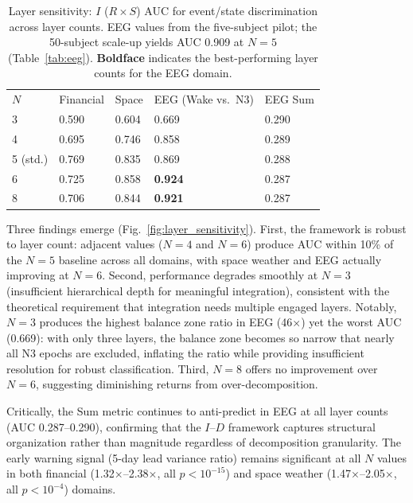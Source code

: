 \documentclass[aip,cha,reprint,amsmath,amssymb,final,floatfix]{revtex4-2}
\begin{document}
\begin{table}[!htbp]
\caption[Layer sensitivity showing I AUC for event discrimination across layer counts 3 through 8]{\label{tab:layers_sensitivity}Layer sensitivity: $I$ ($R \times S$) AUC for event/state discrimination across layer counts. EEG values from the five-subject pilot; the 50-subject scale-up yields AUC 0.909 at $N=5$ (Table~\ref{tab:eeg}). \textbf{Boldface} indicates the best-performing layer counts for the EEG domain.}
\begin{ruledtabular}
\begin{tabular}{lllll}
$N$ & Financial & Space & EEG (Wake vs.\ N3) & EEG Sum \\
3 & 0.590 & 0.604 & 0.669 & 0.290 \\
4 & 0.695 & 0.746 & 0.858 & 0.289 \\
5 (std.) & 0.769 & 0.835 & 0.869 & 0.288 \\
6 & 0.725 & 0.858 & \textbf{0.924} & 0.287 \\
8 & 0.706 & 0.844 & \textbf{0.921} & 0.287 \\
\end{tabular}
\end{ruledtabular}
\end{table}

Three findings emerge (Fig.~\ref{fig:layer_sensitivity}). First, the framework is robust to layer count: adjacent values ($N = 4$ and $N = 6$) produce AUC within 10\% of the $N = 5$ baseline across all domains, with space weather and EEG actually improving at $N = 6$. Second, performance degrades smoothly at $N = 3$ (insufficient hierarchical depth for meaningful integration), consistent with the theoretical requirement that integration needs multiple engaged layers. Notably, $N = 3$ produces the highest balance zone ratio in EEG (46$\times$) yet the worst AUC (0.669): with only three layers, the balance zone becomes so narrow that nearly all N3 epochs are excluded, inflating the ratio while providing insufficient resolution for robust classification. Third, $N = 8$ offers no improvement over $N = 6$, suggesting diminishing returns from over-decomposition.

Critically, the Sum metric continues to anti-predict in EEG at all layer counts (AUC 0.287--0.290), confirming that the $I$--$D$ framework captures structural organization rather than magnitude regardless of decomposition granularity. The early warning signal (5-day lead variance ratio) remains significant at all $N$ values in both financial (1.32$\times$--2.38$\times$, all $p < 10^{-15}$) and space weather (1.47$\times$--2.05$\times$, all $p < 10^{-4}$) domains.
\end{document}
